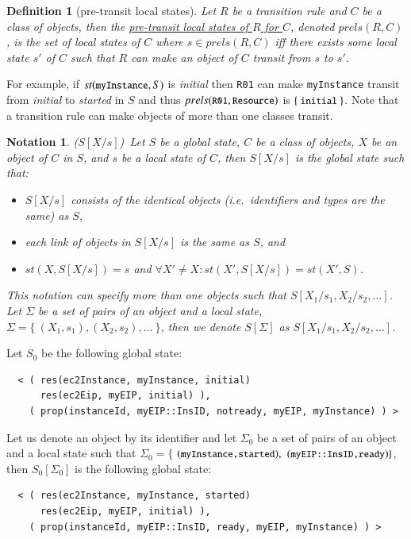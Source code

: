 \documentclass[12pt]{report}
\newtheorem{notation}{Notation}
\newtheorem{definition}{Definition}
\newcommand{\mbstt}[1]{\mbox{\small{\tt {#1}}}}
\newcommand{\stt}[1]{{\small{\tt {#1}}}}
\newcommand{\ul}{\underline}
\begin{document}
\begin{definition}[pre-transit local states]
Let $R$ be a transition rule and $C$ be a class of objects, then
the \ul{pre-transit local states of $R$ for $C$}, denoted
\ul{$prels(R,C)$}, is the set of local states of $C$ where $s \in
prels(R,C)$ iff there exists some local state $s'$ of $C$ such that
$R$ can make an object of $C$ transit from $s$ to $s'$.
\end{definition}
For example, if $st(\mbstt{myInstance},S)$ is {\it initial} then
\stt{R01} can make \stt{myInstance} transit from {\it initial} to {\it
  started} in $S$ and thus $prels(\mbstt{R01},\mbstt{Resource})$ is
$\{~\mbstt{initial}~\}$. Note that a transition rule can make objects
of more than one classes transit.

\begin{notation}($S[X/s]$)\
Let $S$ be a global state, $C$ be a class of objects, $X$ be an object
of $C$ in $S$, and $s$ be a local state of $C$, then
\ul{$S[X/s]$} is the global state such that:
\begin{itemize}
\item $S[X/s]$ consists of the identical objects (i.e.\ identifiers and
  types are the same) as $S$,
\item each link of objects in $S[X/s]$ is the same as $S$, and
\item $st(X,S[X/s])=s$ and $\forall X'\ne X:st(X',S[X/s])=st(X',S)$.
\end{itemize}
This notation can specify more than one objects such that
\ul{$S[X_1/s_1,X_2/s_2,\dots]$}.  Let $\Sigma$ be a set of pairs of
an object and a local state, $\Sigma = \{~ (X_1,s_1), (X_2,s_2), \dots~\}$,
then we denote \ul{$S[\Sigma]$} as $S[X_1/s_1,X_2/s_2,\dots]$.
\end{notation}
Let $S_0$ be the following global state:
\small
\begin{verbatim}
  < ( res(ec2Instance, myInstance, initial)
      res(ec2Eip, myEIP, initial) ),
    ( prop(instanceId, myEIP::InsID, notready, myEIP, myInstance) ) >
\end{verbatim}
\normalsize
Let us denote an object by its identifier and let $\Sigma_0$ be a set
of pairs of an object and a local state such that $\Sigma_0=\{$
$(\mbstt{myInstance,started}),$ $(\mbstt{myEIP::InsID,ready})\}$, then
$S_0[\Sigma_0]$ is the following global state:
\small
\begin{verbatim}
  < ( res(ec2Instance, myInstance, started)
      res(ec2Eip, myEIP, initial) ),
    ( prop(instanceId, myEIP::InsID, ready, myEIP, myInstance) ) >
\end{verbatim}
\normalsize
\end{document}
